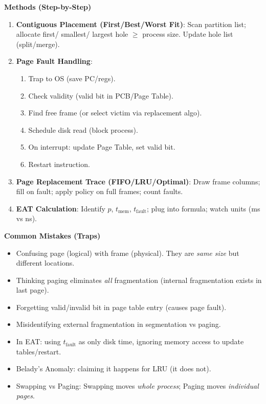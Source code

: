 \documentclass[11pt]{article}
\newcommand{\cle}[1]{{\popxbold\color{popdark}#1}}
\begin{document}
\begin{bilan}
\textbf{Methods (Step-by-Step)}
\begin{enumerate}
    \item \textbf{Contiguous Placement (First/Best/Worst Fit)}: Scan partition list; allocate first/ smallest/ largest hole $\ge$ process size. Update hole list (split/merge).
    \item \textbf{Page Fault Handling}: 
    \begin{enumerate}
        \item Trap to OS (save PC/regs).
        \item Check validity (valid bit in PCB/Page Table).
        \item Find free frame (or select victim via replacement algo).
        \item Schedule disk read (block process).
        \item On interrupt: update Page Table, set valid bit.
        \item Restart instruction.
    \end{enumerate}
    \item \textbf{Page Replacement Trace (FIFO/LRU/Optimal)}: Draw frame columns; fill on fault; apply policy on full frames; count faults.
    \item \textbf{EAT Calculation}: Identify $p$, $t_{\text{mem}}$, $t_{\text{fault}}$; plug into formula; watch units (ms vs ns).
\end{enumerate}

\textbf{Common Mistakes (Traps)}
\begin{itemize}
    \item Confusing \cle{page} (logical) with \cle{frame} (physical). They are \emph{same size} but different locations.
    \item Thinking paging eliminates \emph{all} fragmentation (internal fragmentation exists in last page).
    \item Forgetting \cle{valid/invalid bit} in page table entry (causes page fault).
    \item Misidentifying \cle{external fragmentation} in segmentation vs paging.
    \item In EAT: using $t_{\text{fault}}$ as only disk time, ignoring memory access to update tables/restart.
    \item Belady's Anomaly: claiming it happens for LRU (it does not).
    \item Swapping vs Paging: Swapping moves \emph{whole process}; Paging moves \emph{individual pages}.
\end{itemize}


\end{bilan}
\end{document}
